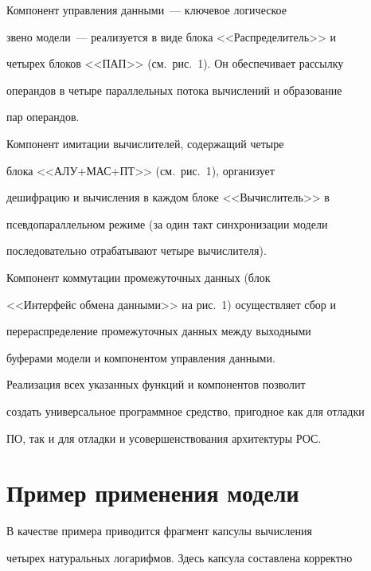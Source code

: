    


   Компонент управления данными~--- ключевое логическое 


звено модели~--- реализуется в виде  блока <<Распределитель>> и 


четырех блоков <<ПАП>> (см.\ рис.~1). Он обеспечивает рассылку 


операндов в четыре параллельных  потока вычислений и образование 


пар операндов.


   


   Компонент имитации вычислителей, содержащий четыре 


блока <<АЛУ\;+\;МАС\;+\;ПТ>>  (см.\ рис.~1), организует 


дешифрацию и вычисления в каждом блоке <<Вычислитель>> в 


псевдопараллельном режиме (за  один такт синхронизации модели 


последовательно отрабатывают четыре вычислителя).


   


   Компонент коммутации  промежуточных данных (блок 


<<Интерфейс обмена данными>> на  рис.~1) осуществляет сбор и 


перераспределение промежуточных данных между выходными 


буферами модели и компонентом управления дан\-ными.


   


   Реализация всех указанных функций и компонентов позволит 


создать универсальное программное  средство, пригодное как для отладки 


ПО, так и для отладки и усовершенствования архитектуры  РОС.





\section{Пример применения модели}





   В качестве примера приводится  фрагмент капсулы вычисления 


четырех натуральных логарифмов. Здесь капсула составлена корректно 


